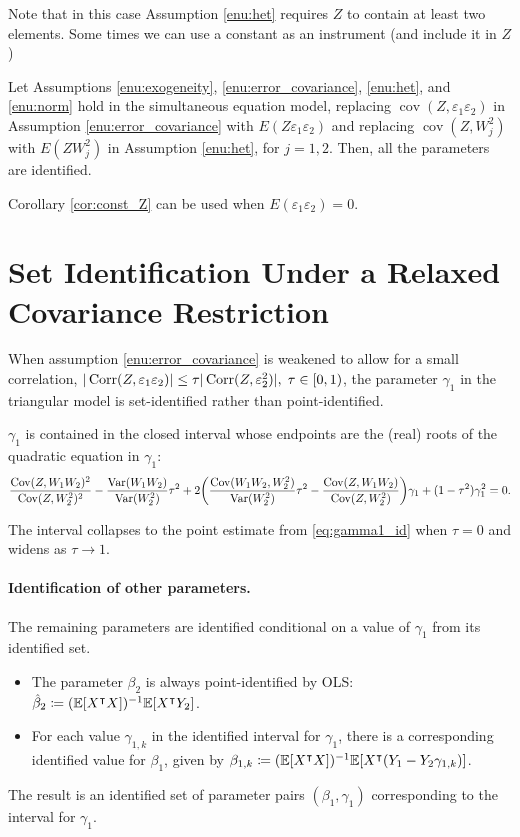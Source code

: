 Note that in this case Assumption \ref{enu:het} requires $Z$ to
contain at least two elements. Some times we can use a constant as
an instrument (and include it in $Z$)
\begin{cor}
\label{cor:const_Z}Let Assumptions \ref{enu:exogeneity}, \ref{enu:error_covariance},
\ref{enu:het}, and \ref{enu:norm} hold in the simultaneous equation
model, replacing $\operatorname{cov}(Z,\varepsilon_{1}\varepsilon_{2})$
in Assumption \ref{enu:error_covariance} with $E\left(Z\varepsilon_{1}\varepsilon_{2}\right)$
and replacing $\operatorname{cov}\left(Z,W_{j}^{2}\right)$ with $E\left(ZW_{j}^{2}\right)$
in Assumption \ref{enu:het}, for $j=1,2$. Then, all the parameters
are identified.
\end{cor}

Corollary \ref{cor:const_Z} can be used when $E\left(\varepsilon_{1}\varepsilon_{2}\right)=0$.

\section{Set Identification Under a Relaxed Covariance Restriction}

When assumption \ref{enu:error_covariance} is weakened to allow for
a small correlation, $|\operatorname{Corr}(Z,\varepsilon_{1}\varepsilon_{2})|\le\tau|\operatorname{Corr}(Z,\varepsilon_{2}^{2})|,\;\tau\in[0,1)$,
the parameter $\gamma_{1}$ in the triangular model is set-identified
rather than point-identified.

\begin{theorem} \label{thm:bounds}
$\gamma_{1}$ is contained in the closed interval whose endpoints
are the (real) roots of the quadratic equation in $\gamma_{1}$:
\[
\frac{\operatorname{Cov}(Z,W_{1}W_{2})^{2}}{\operatorname{Cov}(Z,W_{2}^{2})^{2}}-\frac{\operatorname{Var}(W_{1}W_{2})}{\operatorname{Var}(W_{2}^{2})}\tau^{2}+2\!\left(\frac{\operatorname{Cov}(W_{1}W_{2},W_{2}^{2})}{\operatorname{Var}(W_{2}^{2})}\tau^{2}-\frac{\operatorname{Cov}(Z,W_{1}W_{2})}{\operatorname{Cov}(Z,W_{2}^{2})}\right)\!\gamma_{1}+(1-\tau^{2})\gamma_{1}^{2}=0.
\]
\end{theorem} The interval collapses to the point estimate from \eqref{eq:gamma1_id}
when $\tau=0$ and widens as $\tau\to1$.

\paragraph{Identification of other parameters.}

The remaining parameters are identified conditional on a value of
$\gamma_{1}$ from its identified set.
\begin{itemize}
\itemsep0pt
\item The parameter $\beta_{2}$ is always point-identified by OLS: $\hat{\beta}_{2}\coloneqq(\mathbb{E}[X^{\intercal} X])^{-1}\mathbb{E}[X^{\intercal} Y_{2}]$.
\item For each value $\gamma_{1,k}$ in the identified interval for $\gamma_{1}$,
there is a corresponding identified value for $\beta_{1}$, given
by $\beta_{1,k}\coloneqq(\mathbb{E}[X^{\intercal} X])^{-1}\mathbb{E}[X^{\intercal}(Y_{1}-Y_{2}\gamma_{1,k})]$.
\end{itemize}
The result is an identified set of parameter pairs $(\beta_{1},\gamma_{1})$
corresponding to the interval for $\gamma_{1}$.

